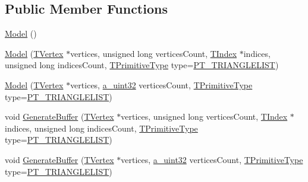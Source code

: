 \subsection*{Public Member Functions}
\begin{DoxyCompactItemize}
\item 
\hyperlink{class_agmd_1_1_model_ae73573da0430bca5ce5a720add64fe82}{Model} ()
\item 
\hyperlink{class_agmd_1_1_model_a3c7f49f7dfc4f67ccd7915cbadf78b36}{Model} (\hyperlink{struct_agmd_1_1_model_1_1_t_vertex}{T\+Vertex} $\ast$vertices, unsigned long vertices\+Count, \hyperlink{class_agmd_1_1_model_aca4a6ee5402b386a0b9d0aea52c71eaa}{T\+Index} $\ast$indices, unsigned long indices\+Count, \hyperlink{namespace_agmd_a0e38d0c34891ddd6eef72e1c9e55161c}{T\+Primitive\+Type} type=\hyperlink{namespace_agmd_a0e38d0c34891ddd6eef72e1c9e55161cab69ba56275be85816ef36f97ee57a0cf}{P\+T\+\_\+\+T\+R\+I\+A\+N\+G\+L\+E\+L\+I\+S\+T})
\item 
\hyperlink{class_agmd_1_1_model_a3b0dd2ec15d80400612b51841c66ae54}{Model} (\hyperlink{struct_agmd_1_1_model_1_1_t_vertex}{T\+Vertex} $\ast$vertices, \hyperlink{_common_defines_8h_a964296f9770051b9e4807b1f180dd416}{a\+\_\+uint32} vertices\+Count, \hyperlink{namespace_agmd_a0e38d0c34891ddd6eef72e1c9e55161c}{T\+Primitive\+Type} type=\hyperlink{namespace_agmd_a0e38d0c34891ddd6eef72e1c9e55161cab69ba56275be85816ef36f97ee57a0cf}{P\+T\+\_\+\+T\+R\+I\+A\+N\+G\+L\+E\+L\+I\+S\+T})
\item 
void \hyperlink{class_agmd_1_1_model_a9f0869f94681218253c5f755d9c896e9}{Generate\+Buffer} (\hyperlink{struct_agmd_1_1_model_1_1_t_vertex}{T\+Vertex} $\ast$vertices, unsigned long vertices\+Count, \hyperlink{class_agmd_1_1_model_aca4a6ee5402b386a0b9d0aea52c71eaa}{T\+Index} $\ast$indices, unsigned long indices\+Count, \hyperlink{namespace_agmd_a0e38d0c34891ddd6eef72e1c9e55161c}{T\+Primitive\+Type} type=\hyperlink{namespace_agmd_a0e38d0c34891ddd6eef72e1c9e55161cab69ba56275be85816ef36f97ee57a0cf}{P\+T\+\_\+\+T\+R\+I\+A\+N\+G\+L\+E\+L\+I\+S\+T})
\item 
void \hyperlink{class_agmd_1_1_model_a24719b1616eee659029213e1882f3a24}{Generate\+Buffer} (\hyperlink{struct_agmd_1_1_model_1_1_t_vertex}{T\+Vertex} $\ast$vertices, \hyperlink{_common_defines_8h_a964296f9770051b9e4807b1f180dd416}{a\+\_\+uint32} vertices\+Count, \hyperlink{namespace_agmd_a0e38d0c34891ddd6eef72e1c9e55161c}{T\+Primitive\+Type} type=\hyperlink{namespace_agmd_a0e38d0c34891ddd6eef72e1c9e55161cab69ba56275be85816ef36f97ee57a0cf}{P\+T\+\_\+\+T\+R\+I\+A\+N\+G\+L\+E\+L\+I\+S\+T})

\end{DoxyCompactItemize}
